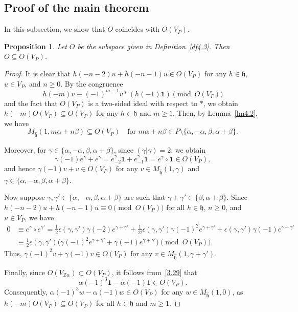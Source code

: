 \documentclass[12pt,a4paper,reqno]{amsart}
\numberwithin{equation}{section}
\numberwithin{equation}{section}
\newtheorem{prop}[thm]{Proposition}
\theoremstyle{definition}
\newcommand{\Z}{\mathbb{Z}}
\def \al{\alpha}
\def \ga {\gamma}
\def \b {\beta}
\def \vac {\mathbf{1}}
\def \h {\mathfrak{h}}
\begin{document}
	
	\subsection{Proof of the main theorem}
	In this subsection, we show that $O$ coincides with $O(V_P)$.
	
	\begin{prop}\label{prop4.4}
		Let $O$ be the subspace given in Definition~\ref{df4.3}. Then $O\subseteq O(V_P)$.
	\end{prop}
	
	\begin{proof}
		It is clear that $h(-n-2)u+h(-n-1)u\in O(V_P)$ for any $h\in \h$, $u\in V_P$, and $n\geq 0$.  
		By the congruence 
		\[
		h(-m)v\equiv (-1)^{m-1}v\ast (h(-1)\vac)\pmod{O(V_P)}
		\]
		and the fact that $O(V_P)$ is a two-sided ideal with respect to $\ast$, we obtain 
		$h(-m)O(V_P)\subseteq O(V_P)$ for any $h\in \h$ and $m\geq 1$.  
		Then, by Lemma~\ref{lm4.2}, we have 
		\[
		M_{\hat{\h}}(1,m\al+n\b)\subseteq O(V_P)
		\quad \text{for } m\al+n\b \in P\setminus\{\al,-\al,\b,\al+\b\}.
		\]
		
		Moreover, for $\ga\in\{\al,-\al,\b,\al+\b\}$, since $(\ga|\ga)=2$, we obtain
		\[
		\ga(-1)e^\ga+e^\ga=e^\ga_{-2}\vac+e^\ga_{-1}\vac=e^\ga\circ\vac\in O(V_P),
		\]
		and hence $\ga(-1)v+v\in O(V_P)$ for any $v\in M_{\hat{\h}}(1,\ga)$ and $\ga\in\{\al,-\al,\b,\al+\b\}$.
		
		Now suppose $\ga,\ga'\in\{\al,-\al,\b,\al+\b\}$ are such that $\ga+\ga'\in\{\b,\al+\b\}$.  
		Since $h(-n-2)u+h(-n-1)u\equiv 0\pmod{O(V_P)}$ for all $h\in\h$, $n\geq 0$, and $u\in V_P$, we have
		\begin{align*}
			0&\equiv e^{\ga}\circ e^{\ga'}=\frac{1}{2}\epsilon(\ga,\ga')\ga(-2)e^{\ga+\ga'}+\frac{1}{2!}\epsilon(\ga,\ga')\ga(-1)^2e^{\ga+\ga'}+\epsilon(\ga,\ga')\ga(-1)e^{\ga+\ga'}\\
			&\equiv \frac{1}{2}\epsilon(\ga,\ga')\big(\ga(-1)^2e^{\ga+\ga'}+\ga(-1)e^{\ga+\ga'}\big)\pmod{O(V_P)}.
		\end{align*}
		Thus, $\ga(-1)^2v+\ga(-1)v\in O(V_P)$ for any $v\in M_{\hat{\h}}(1,\ga+\ga')$.
		
		Finally, since $O(V_{\Z\al})\subset O(V_P)$, it follows from~\eqref{3.29} that 
		\[
		\al(-1)^3\vac-\al(-1)\vac\in O(V_P).
		\]
		Consequently, $\al(-1)^3w-\al(-1)w\in O(V_P)$ for any $w\in M_{\hat{\h}}(1,0)$, as $h(-m)O(V_P)\subseteq O(V_P)$ for all $h\in\h$ and $m\geq 1$.
	\end{proof}
	
\end{document}
